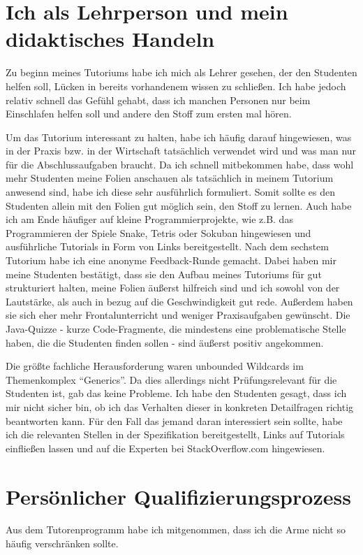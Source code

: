\documentclass[a4paper,12pt]{article}
\begin{document}
\section*{Ich als Lehrperson und mein didaktisches Handeln}
Zu beginn meines Tutoriums habe ich mich als Lehrer gesehen, der
den Studenten helfen soll, Lücken in bereits vorhandenem wissen zu
schließen. Ich habe jedoch relativ schnell das Gefühl gehabt, dass
ich manchen Personen nur beim Einschlafen helfen soll und andere den
Stoff zum ersten mal hören.

Um das Tutorium interessant zu halten, habe ich häufig darauf
hingewiesen, was in der Praxis bzw. in der Wirtschaft tatsächlich
verwendet wird und was man nur für die Abschlussaufgaben braucht.
Da ich schnell mitbekommen habe, dass wohl mehr Studenten meine
Folien anschauen als tatsächlich in meinem Tutorium anwesend sind,
habe ich diese sehr ausführlich formuliert. Somit sollte es den
Studenten allein mit den Folien gut möglich sein, den Stoff zu lernen.
Auch habe ich am Ende häufiger auf kleine Programmierprojekte, wie
z.B. das Programmieren der Spiele Snake, Tetris oder Sokuban hingewiesen
und ausführliche Tutorials in Form von Links bereitgestellt.
Nach dem sechstem Tutorium habe ich eine anonyme Feedback-Runde gemacht.
Dabei haben mir meine Studenten bestätigt, dass sie den Aufbau meines
Tutoriums für gut strukturiert halten, meine Folien äußerst hilfreich
sind und ich sowohl von der Lautstärke, als auch in bezug auf die
Geschwindigkeit gut rede. Außerdem haben sie sich eher mehr
Frontalunterricht und weniger Praxisaufgaben gewünscht. Die
Java-Quizze - kurze Code-Fragmente, die mindestens eine problematische
Stelle haben, die die Studenten finden sollen - sind äußerst positiv
angekommen.

Die größte fachliche Herausforderung waren unbounded Wildcards im
Themenkomplex "`Generics"'. Da dies allerdings nicht Prüfungsrelevant
für die Studenten ist, gab das keine Probleme. Ich habe den
Studenten gesagt, dass ich mir nicht sicher bin, ob ich das Verhalten
dieser in konkreten Detailfragen richtig beantworten kann. Für den
Fall das jemand daran interessiert sein sollte, habe ich die
relevanten Stellen in der Spezifikation bereitgestellt, Links auf
Tutorials einfließen lassen und auf die Experten bei StackOverflow.com
hingewiesen.

\section*{Persönlicher Qualifizierungsprozess}
Aus dem Tutorenprogramm habe ich mitgenommen, dass ich die Arme nicht
so häufig verschränken sollte.
\end{document}
